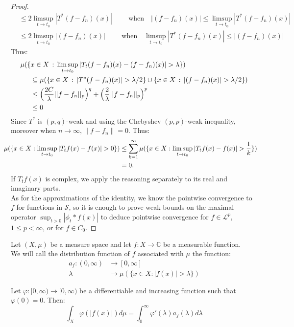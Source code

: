 \begin{proof}{}
\begin{align*}
    &\leq 2\limsup_{t \rightarrow t_0}|T^*(f-f_n)(x)|\hspace{1cm} \text{when}\quad |(f-f_n)(x)|\leq \limsup_{t \rightarrow t_0}|T^*(f-f_n)(x)| \\
    &\leq 2\limsup_{t \rightarrow t_0}|(f-f_n)(x)|\hspace{1cm} \text{when}\quad \limsup_{t \rightarrow t_0}|T^*(f-f_n)(x)|\leq |(f-f_n)(x)|
  \end{align*}
  Thus:
  \begin{align*}
    \mu(\{&x\in X\,:\, \limsup_{t \rightarrow t_0}|T_t(f-f_n)(x)-(f-f_n)(x)|>\lambda\})\\
    &\subseteq \mu(\{x\in X\,:\, |T^*(f-f_n)(x)|>\lambda/2\}\cup \{x\in X\,:\,|(f-f_n)(x)|>\lambda/2\}) \\
    &\leq \Bigl(\frac{2C}{\lambda}||f-f_n||_p\Bigr)^q+\Bigl(\frac{2}{\lambda}||f-f_n||_p\Bigr)^p\\
    &\leq 0 
  \end{align*}
  Since $T^*$ is $(p,q)$-weak and using the Chebyshev $(p,p)$-weak inequality, moreover when $n\to \infty, \|f-f_n\|=0$.
  Thus:
  \begin{align*}
    \hspace{-0.4cm}\mu(\{x \in X:\limsup_{t \rightarrow t_0}|T_t f(x)-f(x)|>0\}) &\leq\sum_{k=1}^{\infty}\mu(\{x\in X:\limsup_{t\rightarrow t_0}|T_t f(x)-f(x)|>\frac{1}{k}\})\\
    &=0.
  \end{align*}
  If $T_tf(x)$ is complex, we apply the reasoning separately to its real and imaginary parts.\\
  As for the approximations of the identity, we know the pointwise convergence to $f$ for functions in $\mathcal{S}$, so it is enough to prove weak bounds on the maximal operator $\sup_{t>0}|\phi_t*f(x)|$ to deduce pointwise convergence for $f\in\mathcal{L}^p$, $1\leq p <\infty$, or for $f\in C_0$.
\end{proof}
\begin{definition}{}
  Let $(X,\mu)$ be a measure space and let $f:X\rightarrow \mathbb{C}$ be a measurable function.\\
  We will call the distribution function of $f$ associated with $\mu$ the function:
  \begin{align*}
    a_f:(0,\infty)&\rightarrow [0,\infty]\\
    \lambda&\rightarrow \mu(\{x\in X: |f(x)|>\lambda\})	
  \end{align*}
\end{definition}
\begin{proposition}{}
  Let $\varphi:[0,\infty)\rightarrow[0,\infty)$ be a differentiable and increasing function such that $\varphi(0)=0$. Then:
  $$\int_X \varphi(|f(x)|)d\mu=\int_0^\infty \varphi'(\lambda)a_f(\lambda)d\lambda$$
\end{proposition}

